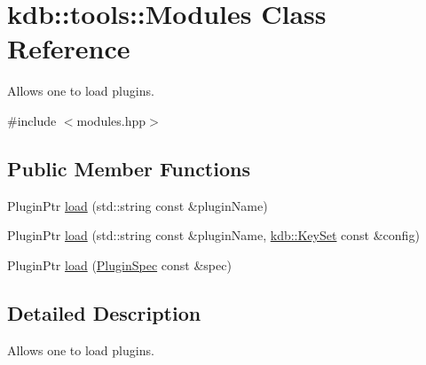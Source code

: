 \hypertarget{classkdb_1_1tools_1_1Modules}{\section{kdb\+:\+:tools\+:\+:Modules Class Reference}
\label{classkdb_1_1tools_1_1Modules}
}


Allows one to load plugins.  




{\ttfamily \#include $<$modules.\+hpp$>$}

\subsection*{Public Member Functions}
\begin{DoxyCompactItemize}
\item 
Plugin\+Ptr \hyperlink{classkdb_1_1tools_1_1Modules_ae8d8c91745c9f517e6e8a556f1664f69}{load} (std\+::string const \&plugin\+Name)
\item 
Plugin\+Ptr \hyperlink{classkdb_1_1tools_1_1Modules_a6ae72cc8e30fe3fb0aabd6f78fad8ddf}{load} (std\+::string const \&plugin\+Name, \hyperlink{classkdb_1_1KeySet}{kdb\+::\+Key\+Set} const \&config)
\item 
Plugin\+Ptr \hyperlink{classkdb_1_1tools_1_1Modules_abdbcc54896557ad3123d0a12be9f437a}{load} (\hyperlink{classkdb_1_1tools_1_1PluginSpec}{Plugin\+Spec} const \&spec)
\end{DoxyCompactItemize}


\subsection{Detailed Description}
Allows one to load plugins. 


